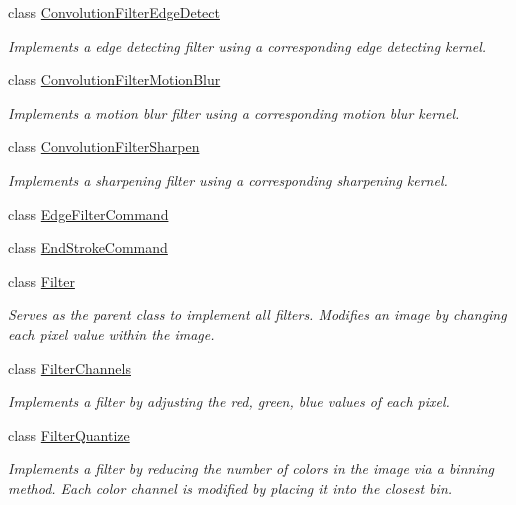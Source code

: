 \begin{DoxyCompactItemize}
class \hyperlink{classimage__tools_1_1ConvolutionFilterEdgeDetect}{Convolution\+Filter\+Edge\+Detect}
\begin{DoxyCompactList}\small\item\em Implements a edge detecting filter using a corresponding edge detecting kernel. \end{DoxyCompactList}\item 
class \hyperlink{classimage__tools_1_1ConvolutionFilterMotionBlur}{Convolution\+Filter\+Motion\+Blur}
\begin{DoxyCompactList}\small\item\em Implements a motion blur filter using a corresponding motion blur kernel. \end{DoxyCompactList}\item 
class \hyperlink{classimage__tools_1_1ConvolutionFilterSharpen}{Convolution\+Filter\+Sharpen}
\begin{DoxyCompactList}\small\item\em Implements a sharpening filter using a corresponding sharpening kernel. \end{DoxyCompactList}\item 
class \hyperlink{classimage__tools_1_1EdgeFilterCommand}{Edge\+Filter\+Command}
\item 
class \hyperlink{classimage__tools_1_1EndStrokeCommand}{End\+Stroke\+Command}
\item 
class \hyperlink{classimage__tools_1_1Filter}{Filter}
\begin{DoxyCompactList}\small\item\em Serves as the parent class to implement all filters. Modifies an image by changing each pixel value within the image. \end{DoxyCompactList}\item 
class \hyperlink{classimage__tools_1_1FilterChannels}{Filter\+Channels}
\begin{DoxyCompactList}\small\item\em Implements a filter by adjusting the red, green, blue values of each pixel. \end{DoxyCompactList}\item 
class \hyperlink{classimage__tools_1_1FilterQuantize}{Filter\+Quantize}
\begin{DoxyCompactList}\small\item\em Implements a filter by reducing the number of colors in the image via a binning method. Each color channel is modified by placing it into the closest bin. \end{DoxyCompactList}\item 

\end{DoxyCompactItemize}
